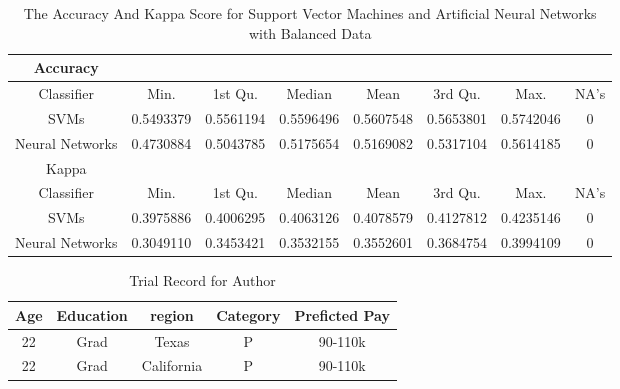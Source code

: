 \documentclass{article}
\begin{document}
    \begin{center}
        \begin{table}
            \centering
            \begin{tabular}{ |c|c|c|c|c|c|c|c| }
                \hline
                Accuracy \\
                \hline
                Classifier & Min. & 1st Qu. & Median & Mean & 3rd Qu. & Max. & NA's \\
                SVMs & 0.5493379 & 0.5561194 & 0.5596496 & 0.5607548 & 0.5653801 & 0.5742046 & 0 \\
                Neural Networks & 0.4730884 & 0.5043785 & 0.5175654 & 0.5169082 & 0.5317104 & 0.5614185 & 0 \\
                \hline
                Kappa \\
                \hline
                Classifier & Min. & 1st Qu. & Median & Mean & 3rd Qu. & Max. & NA's \\
                SVMs & 0.3975886 & 0.4006295 & 0.4063126 & 0.4078579 & 0.4127812 & 0.4235146 & 0 \\
                Neural Networks & 0.3049110 & 0.3453421 & 0.3532155 & 0.3552601 & 0.3684754 & 0.3994109 & 0 \\
                \hline
            \end{tabular}
            \caption{The Accuracy And Kappa Score for Support Vector Machines and Artificial Neural Networks with Balanced Data}
            \label{tab:13}
        \end{table}
    \end{center}

    \begin{center}
        \begin{table}
            \centering
            \begin{tabular}{ |c|c|c|c|c| }
                \hline
                Age & Education & region & Category & Preficted Pay \\
                \hline
                22 & Grad & Texas & P & 90-110k \\
                22 & Grad & California & P & 90-110k \\
                \hline
            \end{tabular}
            \caption{Trial Record for Author}
            \label{tab:14}
        \end{table}
    \end{center}

\end{document}
